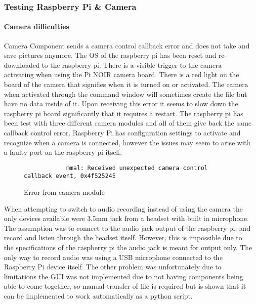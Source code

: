 \subsubsection{Testing Raspberry Pi \& Camera}
		\paragraph{Camera difficulties}Camera Component sends a camera control callback error and does not take and save pictures anymore. The OS of the raspberry pi has been reset and re-downloaded to the raspberry pi. There is a visible trigger to the camera activating when using the Pi NOIR camera board. There is a red light on the board of the camera that signifies when it is turned on or activated. The camera when activated through the command window will sometimes create the file but have no data inside of it. Upon receiving this error it seems to slow down the raspberry pi board significantly that it requires a restart. The raspberry pi has been test with three different camera modules and all of them give back the same callback control error.  Raspberry Pi has configuration settings to activate and recognize when a camera is connected, however the issues may seem to arise with a faulty port on the raspberry pi itself.
		\begin{figure}[h]
			\begin{lstlisting}
			mmal: Received unexpected camera control callback event, 0x4f525245
			\end{lstlisting}
			\label{fig:camErr}
			\caption{Error from camera module}
		\end{figure}
		\par When attempting to switch to audio recording instead of using the camera the only devices available were 3.5mm jack from a headset with built in microphone. The assumption was to connect to the audio jack output of the raspberry pi, and record and listen through the headset itself. However, this is impossible due to the specifications of the raspberry pi the audio jack is meant for output only. The only way to record audio was using a USB microphone connected to the Raspberry Pi device itself. The other problem was unfortunately due to limitations the GUI was not implemented due to not having components being able to come together, so manual transfer of file is required but is shown that it can be implemented to work automatically as a python script.
		
